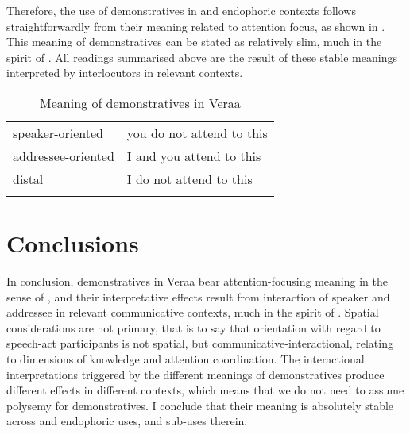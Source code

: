 \documentclass[output=paper
,modfonts
,nonflat]{langsci/langscibook}
\begin{document}
Therefore, the use of demonstratives in  and endophoric contexts follows straightforwardly from their meaning related to attention focus, as shown in . This meaning of demonstratives can be stated as relatively slim, much in the spirit of \cite{Enfield2003}. All readings summarised above are the result of these stable meanings interpreted by interlocutors in relevant contexts. 

\begin{table}
\caption{Meaning of demonstratives in Vera{\textquotesingle}a}
\label{demvrameaning}
 \begin{tabularx}{\textwidth}{Xl} 
  \lsptoprule
 speaker-oriented		&		you do not attend to this	\\
addressee-oriented	&		I and you attend to this	\\
distal												&		I	do not attend to this	\\
  \lspbottomrule
 \end{tabularx}
\end{table}


\section{Conclusions}	\label{section5}
In conclusion, demonstratives in Vera{\textquotesingle}a bear attention-focusing meaning in the sense of \cite{Diessel2006}, and their interpretative effects result from interaction of speaker and addressee in relevant communicative contexts, much in the spirit of \cite{Enfield2003}. Spatial considerations are not primary, that is to say that orientation with regard to speech-act participants is not spatial, but communicative-interactional, relating to dimensions of knowledge and attention coordination. The interactional interpretations triggered by the different meanings of demonstratives produce different effects in different contexts, which means that we do  not need to assume polysemy for demonstratives. I conclude that their meaning is absolutely stable across  and endophoric uses, and sub-uses therein.
\end{document}
